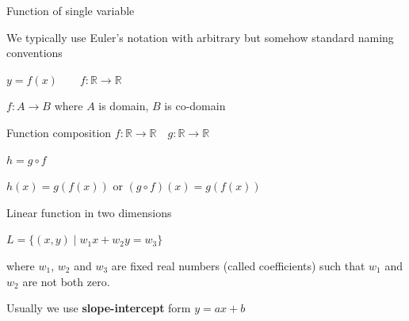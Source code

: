 \documentclass[12pt,aspectratio=169,handout]{beamer}
\begin{document}
\begin{frame}{Function of single variable}
	
	We typically use Euler's notation with arbitrary but somehow standard naming conventions
	
	$y = f (x) \qquad f: \mathbb{R} \to \mathbb{R}$
	
	$f : A \to B$ where $A$ is domain, $B$ is co-domain
	
	\bigskip
	
	\begin{block}{Function composition}
		$f: \mathbb{R} \to \mathbb{R} \quad g: \mathbb{R} \to \mathbb{R}$
		
		$h = g \circ f$
		
		$h(x) = g(f(x))$ or $(g \circ f)(x)= g(f(x))$
	\end{block}
	
\end{frame}


\begin{frame}{Linear function in two dimensions}
	
$L=\{(x,y)\mid w_1 x+ w_2 y= w_3\}$
	
	where $w_1$, $w_2$ and $w_3$ are fixed real numbers (called coefficients) such that $w_1$ and $w_2$ are not both zero.

	Usually we use \textbf{slope-intercept} form $y= a x + b$
	
	
\end{frame}
\end{document}
